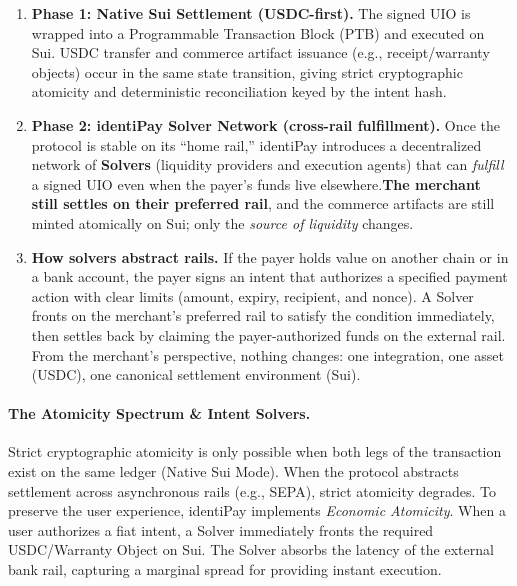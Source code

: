 \documentclass[11pt]{article}
\begin{document}
\begin{enumerate}
    \item \textbf{Phase 1: Native Sui Settlement (USDC-first).}
    The signed UIO is wrapped into a Programmable Transaction Block (PTB) and executed on Sui. USDC transfer and commerce artifact issuance (e.g., receipt/warranty objects) occur in the same state transition, giving strict cryptographic atomicity and deterministic reconciliation keyed by the intent hash.

    \item \textbf{Phase 2: identiPay Solver Network (cross-rail fulfillment).}
    Once the protocol is stable on its ``home rail,'' identiPay introduces a decentralized network of \textbf{Solvers} (liquidity providers and execution agents) that can \emph{fulfill} a signed UIO even when the payer's funds live elsewhere.\textbf{The merchant still settles on their preferred rail}, and the commerce artifacts are still minted atomically on Sui; only the \emph{source of liquidity} changes.

    \item \textbf{How solvers abstract rails.}
    If the payer holds value on another chain or in a bank account, the payer signs an intent that authorizes a specified payment action with clear limits (amount, expiry, recipient, and nonce). A Solver fronts on the merchant's preferred rail to satisfy the condition immediately, then settles back by claiming the payer-authorized funds on the external rail. From the merchant's perspective, nothing changes: one integration, one asset (USDC), one canonical settlement environment (Sui).
\end{enumerate}

\paragraph{The Atomicity Spectrum \& Intent Solvers.}
Strict cryptographic atomicity is only possible when both legs of the transaction exist on the same ledger (Native Sui Mode). When the protocol abstracts settlement across asynchronous rails (e.g., SEPA), strict atomicity degrades. To preserve the user experience, identiPay implements \emph{Economic Atomicity}. When a user authorizes a fiat intent, a Solver immediately fronts the required USDC/Warranty Object on Sui. The Solver absorbs the latency of the external bank rail, capturing a marginal spread for providing instant execution.
\end{document}
